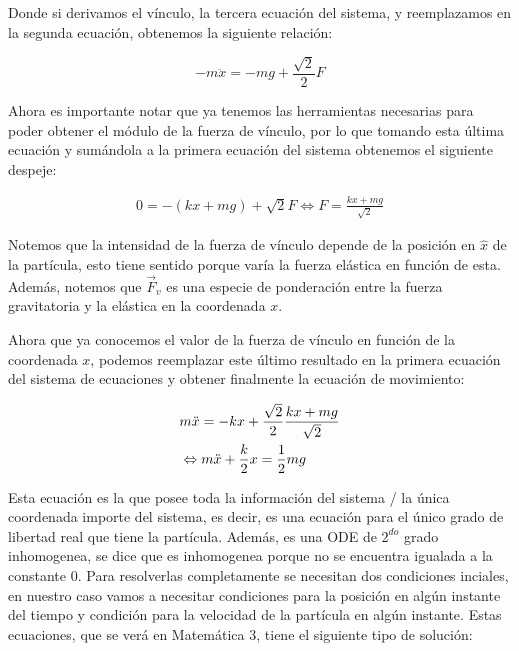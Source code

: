 \documentclass{article}
\begin{document}
\begin{multicols}{2}
Donde si derivamos el vínculo, la tercera ecuación del sistema, y reemplazamos en la segunda ecuación, obtenemos la siguiente relación:

\begin{equation}
    -m\ddot{x} = -mg + \frac{\sqrt{2}}{2}F
\end{equation}

Ahora es importante notar que ya tenemos las herramientas necesarias para poder obtener el módulo de la fuerza de vínculo, por lo que tomando esta última ecuación y sumándola a la primera ecuación del sistema obtenemos el siguiente despeje:

\begin{equation}
\begin{split}
    0 = -(kx + mg) + \sqrt{2}F
    \Leftrightarrow F = \frac{kx + mg}{\sqrt{2}}
\end{split}
\end{equation}

Notemos que la intensidad de la fuerza de vínculo depende de la posición en $\hat{x}$ de la partícula, esto tiene sentido porque varía la fuerza elástica en función de esta. Además, notemos que $\vec{F}_v$ es una especie de ponderación entre la fuerza gravitatoria y la elástica en la coordenada $x$.

Ahora que ya conocemos el valor de la fuerza de vínculo en función de la coordenada $x$, podemos reemplazar este último resultado en la primera ecuación del sistema de ecuaciones y obtener finalmente la ecuación de movimiento:

\begin{equation}
    \centering
    \begin{split}
        &m\ddot{x} = -kx + \frac{\sqrt{2}}{2}\frac{kx + mg}{\sqrt{2}} \\
        &\Leftrightarrow m\ddot{x} + \frac{k}{2}x = \frac{1}{2}mg
    \end{split}
\end{equation}

Esta ecuación es la que posee toda la información del sistema / la única coordenada importe del sistema, es decir, es una ecuación para el único grado de libertad real que tiene la partícula. Además, es una ODE de $2^{do}$ grado inhomogenea, se dice que es inhomogenea porque no se encuentra igualada a la constante $0$. Para resolverlas completamente se necesitan dos condiciones inciales, en nuestro caso vamos a necesitar condiciones para la posición en algún instante del tiempo y condición para la velocidad de la partícula en algún instante. Estas ecuaciones, que se verá en Matemática 3, tiene el siguiente tipo de solución:


\end{multicols}
\end{document}
